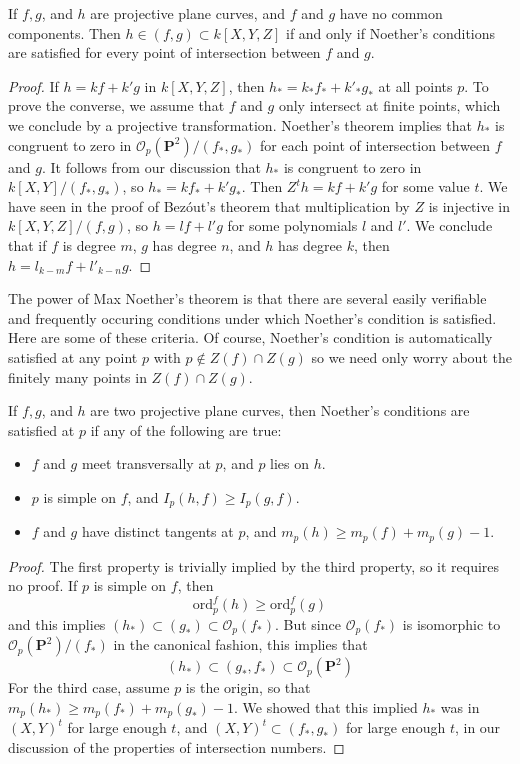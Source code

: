 \begin{theorem}
    If $f,g$, and $h$ are projective plane curves, and $f$ and $g$ have no common components. Then $h \in (f,g) \subset k[X,Y,Z]$ if and only if Noether's conditions are satisfied for every point of intersection between $f$ and $g$.
\end{theorem}
\begin{proof}
    If $h = kf + k'g$ in $k[X,Y,Z]$, then $h_* = k_*f_* + k'_* g_*$ at all points $p$. To prove the converse, we assume that $f$ and $g$ only intersect at finite points, which we conclude by a projective transformation. Noether's theorem implies that $h_*$ is congruent to zero in $\mathcal{O}_p(\mathbf{P}^2)/(f_*,g_*)$ for each point of intersection between $f$ and $g$. It follows from our discussion that $h_*$ is congruent to zero in $k[X,Y]/(f_*,g_*)$, so $h_* = kf_* + k'g_*$. Then $Z^th = kf + k'g$ for some value $t$. We have seen in the proof of Bez\'{o}ut's theorem that multiplication by $Z$ is injective in $k[X,Y,Z]/(f,g)$, so $h = lf + l'g$ for some polynomials $l$ and $l'$. We conclude that if $f$ is degree $m$, $g$ has degree $n$, and $h$ has degree $k$, then $h = l_{k-m}f + l'_{k-n}g$.
\end{proof}

The power of Max Noether's theorem is that there are several easily verifiable and frequently occuring conditions under which Noether's condition is satisfied. Here are some of these criteria. Of course, Noether's condition is automatically satisfied at any point $p$ with $p \not \in Z(f) \cap Z(g)$ so we need only worry about the finitely many points in $Z(f) \cap Z(g)$.

\begin{theorem}
    If $f,g$, and $h$ are two projective plane curves, then Noether's conditions are satisfied at $p$ if any of the following are true:
    \begin{itemize}
        \item $f$ and $g$ meet transversally at $p$, and $p$ lies on $h$.
        \item $p$ is simple on $f$, and $I_p(h,f) \geq I_p(g,f)$.
        \item $f$ and $g$ have distinct tangents at $p$, and $m_p(h) \geq m_p(f) + m_p(g) - 1$.
    \end{itemize}
\end{theorem}
\begin{proof}
    The first property is trivially implied by the third property, so it requires no proof. If $p$ is simple on $f$, then
    \[ \text{ord}_p^f(h) \geq \text{ord}_p^f(g) \]
    and this implies $(h_*) \subset (g_*) \subset \mathcal{O}_p(f_*)$. But since $\mathcal{O}_p(f_*)$ is isomorphic to $\mathcal{O}_p(\mathbf{P}^2)/(f_*)$ in the canonical fashion, this implies that
    \[ (h_*) \subset (g_*,f_*) \subset \mathcal{O}_p(\mathbf{P}^2) \]
    For the third case, assume $p$ is the origin, so that $m_p(h_*) \geq m_p(f_*) + m_p(g_*) - 1$. We showed that this implied $h_*$ was in $(X,Y)^t$ for large enough $t$, and $(X,Y)^t \subset (f_*,g_*)$ for large enough $t$, in our discussion of the properties of intersection numbers.
\end{proof}


